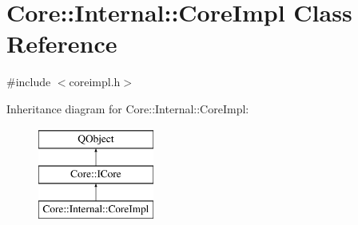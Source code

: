 \hypertarget{class_core_1_1_internal_1_1_core_impl}{\section{Core\-:\-:Internal\-:\-:Core\-Impl Class Reference}
\label{class_core_1_1_internal_1_1_core_impl}
}


{\ttfamily \#include $<$coreimpl.\-h$>$}

Inheritance diagram for Core\-:\-:Internal\-:\-:Core\-Impl\-:\begin{figure}[H]
\begin{center}
\leavevmode
\includegraphics[height=3.000000cm]{class_core_1_1_internal_1_1_core_impl}
\end{center}
\end{figure}
